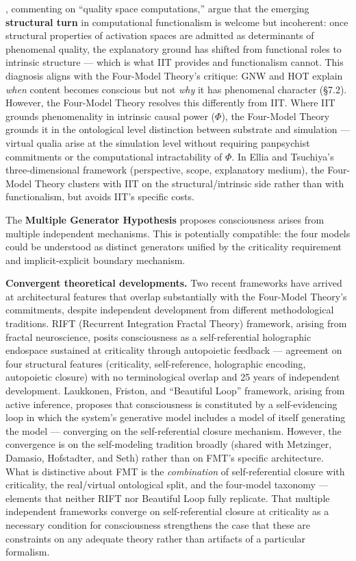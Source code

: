 \documentclass[12pt]{article}
\newcommand{\revstart}{}
\newcommand{\revend}{}
\begin{document}
\citet{Ellia2025}, commenting on \citet{Fleming2024} ``quality space computations,'' argue that the emerging \textbf{structural turn} in computational functionalism is welcome but incoherent: once structural properties of activation spaces are admitted as determinants of phenomenal quality, the explanatory ground has shifted from functional roles to intrinsic structure --- which is what IIT provides and functionalism cannot. This diagnosis aligns with the Four-Model Theory's critique: GNW and HOT explain \emph{when} content becomes conscious but not \emph{why} it has phenomenal character (\S7.2). However, the Four-Model Theory resolves this differently from IIT. Where IIT grounds phenomenality in intrinsic causal power ($\Phi$), the Four-Model Theory grounds it in the ontological level distinction between substrate and simulation --- virtual qualia arise at the simulation level without requiring panpsychist commitments or the computational intractability of $\Phi$. In Ellia and Tsuchiya's three-dimensional framework (perspective, scope, explanatory medium), the Four-Model Theory clusters with IIT on the structural/intrinsic side rather than with functionalism, but avoids IIT's specific costs.

The \textbf{Multiple Generator Hypothesis} \citep{KirkebyHinrup2025} proposes consciousness arises from multiple independent mechanisms. This is potentially compatible: the four models could be understood as distinct generators unified by the criticality requirement and implicit-explicit boundary mechanism.

{\revstart\textbf{Convergent theoretical developments.} Two recent frameworks have arrived at architectural features that overlap substantially with the Four-Model Theory's commitments, despite independent development from different methodological traditions. \citet{Bieberich2026} RIFT (Recurrent Integration Fractal Theory) framework, arising from fractal neuroscience, posits consciousness as a self-referential holographic endospace sustained at criticality through autopoietic feedback --- agreement on four structural features (criticality, self-reference, holographic encoding, autopoietic closure) with no terminological overlap and 25 years of independent development. Laukkonen, Friston, and \citet{Laukkonen2025} ``Beautiful Loop'' framework, arising from active inference, proposes that consciousness is constituted by a self-evidencing loop in which the system's generative model includes a model of itself generating the model --- converging on the self-referential closure mechanism. However, the convergence is on the self-modeling tradition broadly (shared with Metzinger, Damasio, Hofstadter, and Seth) rather than on FMT's specific architecture. What is distinctive about FMT is the \emph{combination} of self-referential closure with criticality, the real/virtual ontological split, and the four-model taxonomy --- elements that neither RIFT nor Beautiful Loop fully replicate. That multiple independent frameworks converge on self-referential closure at criticality as a necessary condition for consciousness strengthens the case that these are constraints on any adequate theory rather than artifacts of a particular formalism.\revend}
\end{document}
